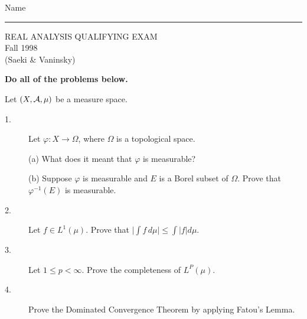 \documentclass[bbb]{report}
\def\ds{\displaystyle}
\begin{document}
\begin{Large}

\hfill Name \rule{2.5in}{.01in}
\par
\vspace{.25in}

\begin{center}
   REAL ANALYSIS QUALIFYING EXAM \\
   Fall 1998 \\
   (Saeki \& Vaninsky) \\
\end{center}


\vspace{.1in}


\begin{center} {\bf
Do all of the problems below.} \end{center}


\vspace{.2in}


Let $(X,{\cal A}, \mu)$ be a measure space.
\vspace{.15in}

\begin{description}


\item[1.]
Let $\varphi:X\to\Omega$, where $\Omega$ is a topological space.

\vspace{.1in}

\item[\quad] (a)
What does it meant that $\varphi$ is measurable?
\vspace{.25in}

\item[\quad] (b)
Suppose $\varphi$ is measurable and $E$ is a Borel subset of $\Omega$.
Prove that $\varphi^{-1}(E)$ is measurable.

\vspace{.5in}

\item[2.]
Let $f\in L^1(\mu)$. Prove that
$\bigg|\ds\int f\,d\mu\bigg| \leq \ds\int|f|d\mu$.

\vspace{.5in}

\item[3.]
Let $1\leq p<\infty$. Prove the completeness of $L^P(\mu)$.

\vspace{.5in}

\item[4.]
Prove the Dominated Convergence Theorem by applying
Fatou's Lemma.


\end{description}
\end{Large}
\end{document}
